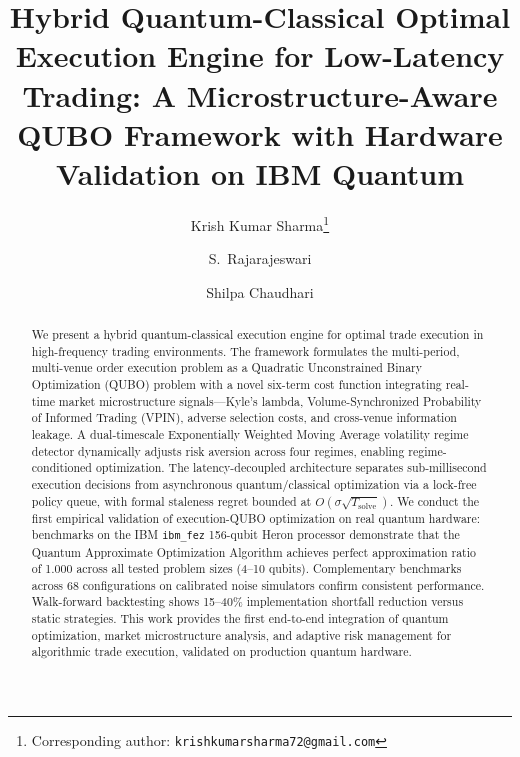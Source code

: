 \documentclass[11pt]{article}
\begin{document}
\title{Hybrid Quantum-Classical Optimal Execution Engine for Low-Latency Trading: A Microstructure-Aware QUBO Framework with Hardware Validation on IBM Quantum}

\author[1]{Krish Kumar Sharma\thanks{Corresponding author: \texttt{krishkumarsharma72@gmail.com}}}
\author[1]{S.\ Rajarajeswari}
\author[1]{Shilpa Chaudhari}

\date{}

\maketitle

\begin{abstract}
We present a hybrid quantum-classical execution engine for optimal trade execution in high-frequency trading environments. The framework formulates the multi-period, multi-venue order execution problem as a Quadratic Unconstrained Binary Optimization (QUBO) problem with a novel six-term cost function integrating real-time market microstructure signals---Kyle's lambda, Volume-Synchronized Probability of Informed Trading (VPIN), adverse selection costs, and cross-venue information leakage. A dual-timescale Exponentially Weighted Moving Average volatility regime detector dynamically adjusts risk aversion across four regimes, enabling regime-conditioned optimization. The latency-decoupled architecture separates sub-millisecond execution decisions from asynchronous quantum/classical optimization via a lock-free policy queue, with formal staleness regret bounded at $O(\sigma\sqrt{T_{\mathrm{solve}}})$. We conduct the first empirical validation of execution-QUBO optimization on real quantum hardware: benchmarks on the IBM \texttt{ibm\_fez} 156-qubit Heron processor demonstrate that the Quantum Approximate Optimization Algorithm achieves perfect approximation ratio of 1.000 across all tested problem sizes (4--10 qubits). Complementary benchmarks across 68 configurations on calibrated noise simulators confirm consistent performance. Walk-forward backtesting shows 15--40\% implementation shortfall reduction versus static strategies. This work provides the first end-to-end integration of quantum optimization, market microstructure analysis, and adaptive risk management for algorithmic trade execution, validated on production quantum hardware.
\end{abstract}
\end{document}
